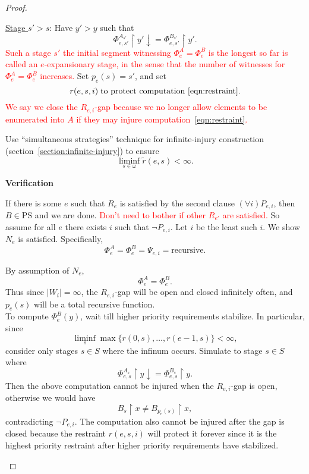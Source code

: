 \documentclass{article}
\newcommand{\COMMENT}[1]{\textcolor{red}{#1}}
\begin{document}
\begin{proof}
\begin{tcolorbox}
      \underline{Stage $s'>s$}: Have $y'>y$ such that
      \begin{equation}
        \Phi_{e,s'}^{A_{s'}}\restriction y' \downarrow=
        \Phi_{e,s'}^{B_{s'}}\restriction y'.
      \end{equation}
      \COMMENT{Such a stage $s'$ the initial segment witnessing
      $\Phi_e^A=\Phi_e^B$ is the longest so far is called an
      $e$-expansionary stage, in the sense that the number of witnesses for
      $\Phi_e^A=\Phi_e^B$ increases.} Set $p_e(s)=s'$, and set
      \begin{equation}
        r(e,s,i)\; \text{to protect computation~\eqref{eqn:restraint}}.
        \label{eqn:r}
      \end{equation}
      \COMMENT{We say we close the $R_{e,i}$-gap because we no longer allow
      elements to be enumerated into $A$ if they may injure
      computation~\eqref{eqn:restraint}.}
    \end{tcolorbox}

    Use ``simultaneous strategies'' technique for infinite-injury
    construction (section~\ref{section:infinite-injury}) to ensure
    \[\liminf_{s\in\omega} \tilde{r}(e,s) <\infty.\]

    \textbf{Verification}
    \begin{tcolorbox}
      If there is some $e$ such that $R_e$ is satisfied by the second
      clause $(\forall i)P_{e,i}$, then $B\in\text{PS}$ and we are done.
      \COMMENT{Don't need to bother if other $R_{e'}$ are satisfied.} So
      assume for all $e$ there exists $i$ such that $\neg P_{e,i}$. Let $i$
      be the least such $i$. We show $N_e$ is satisfied. Specifically,
      \[\Phi^A_e=\Phi^B_e=\Psi_{e,i} =\text{recursive}.\]

      By assumption of $N_e$,
      \[\Phi^A_e=\Phi^B_e.\]
      Thus since $|W_i|=\infty$, the $R_{e,i}$-gap will be open and closed
      infinitely often, and $p_e(s)$ will be a total recursive function.\\

      To compute $\Phi^B_e(y)$, wait till higher priority requirements
      stabilize. In particular, since
      \[\liminf_s \max\{r(0,s),\ldots,r(e-1,s)\} <\infty,\]
      consider only stages $s\in S$ where the infinum occurs. Simulate to
      stage $s\in S$ where
      \begin{equation}
        \Phi_{e,s}^{A_s}\restriction y \downarrow=
        \Phi_{e,s}^{B_s}\restriction y.
      \end{equation}
      Then the above computation cannot be injured when the $R_{e,i}$-gap
      is open, otherwise we would have
      \[B_s\restriction x \neq B_{p_e(s)}\restriction x,\]
      contradicting $\neg P_{e,i}$. The computation also cannot be injured
      after the gap is closed because the restraint $r(e,s,i)$ will protect
      it forever since it is the highest priority restraint after higher
      priority requirements have stabilized.
    \end{tcolorbox}
  \end{proof}
\end{document}
